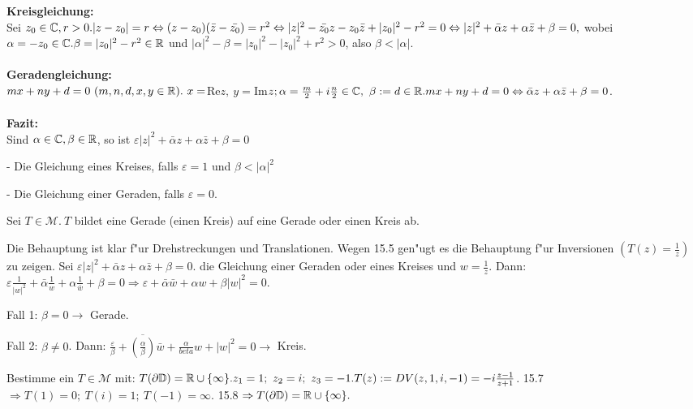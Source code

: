 \documentclass{article}
\begin{document}
{\bf Kreisgleichung:}\\
Sei $z_0 \in \mathbb{C}, r>0. |z-z_0|=r \Leftrightarrow (z-z_0)(\bar{z}-\bar{z_0}) = r^2 \Leftrightarrow |z|^2 - \bar{z_0}z-z_0\bar{z}+|z_0|^2-r^2=0 \Leftrightarrow |z|^2 + \bar{\alpha}z + \alpha\bar{z}+\beta=0,$ wobei $\alpha = -z_0 \in \mathbb{C}. \beta = |z_0|^2-r^2 \in \mathbb{R}$ und $|\alpha|^2-\beta = |z_0|^2-|z_0|^2+r^2 > 0$, also $ \beta < |\alpha|$.\\
\\
{\bf Geradengleichung:}\\
$mx+ny+d=0 \ (m,n,d,x,y \in \mathbb{R}). \ x = $Re$ z, \ y= $Im$ z; \alpha = \frac{m}{2}+i\frac{n}{2} \in \MdC, \ \beta := d \in \MdR. mx+ny+d = 0 \Leftrightarrow \bar{\alpha}z+\alpha\bar{z}+\beta=0$.\\
\\
{\bf Fazit:}\\
Sind $\alpha \in \mathbb{C}, \beta \in \mathbb{R}$, so ist $\varepsilon |z|^2 + \bar{\alpha}z + \alpha\bar{z}+\beta = 0$
\begin{liste}
\item[-] Die Gleichung eines Kreises, falls $\varepsilon = 1$ und $\beta < |\alpha|^2$
\item[-] Die Gleichung einer Geraden, falls $\varepsilon = 0.$
\end{liste}

\begin{satz}
Sei $T \in \mathcal{M}.\ T$ bildet eine Gerade (einen Kreis) auf eine Gerade oder einen Kreis ab.
\end{satz}

\begin{beweis}
Die Behauptung ist klar f"ur Drehstreckungen und Translationen. Wegen 15.5 gen"ugt es die Behauptung f"ur Inversionen $(T(z) = \frac1z)$ zu zeigen. Sei $\varepsilon|z|^2 + \bar{\alpha}z + \alpha\bar{z}+\beta =0$. die Gleichung einer Geraden oder eines Kreises und $w = \frac1z$. Dann: $\varepsilon \frac1{|w|^2}+ \bar{\alpha}\frac1w + \alpha \frac1{\bar{w}}+ \beta = 0 \Rightarrow \varepsilon + \bar{\alpha}\bar{w}+\alpha w + \beta |w|^2 = 0.$
\begin{liste}
\item[Fall 1:] $\beta = 0 \rightarrow$ Gerade.
\item[Fall 2:] $\beta \not=0$. Dann: $\frac{\varepsilon}{\beta} + \overline{\left(\frac{\alpha}{\beta}\right)} \bar{w} + \frac{\alpha}{beta}w + |w|^2 = 0 \rightarrow$ Kreis.
\end{liste}
\end{beweis}

\begin{beispiel}
Bestimme ein $T \in \mathcal{M}$ mit: $T(\partial \mathbb{D}) = \mathbb{R} \cup \{ \infty \}. z_1 = 1; \ z_2=i; \ z_3 = -1. T(z) := DV(z,1,i,-1) = -i\frac{z-1}{z+1}$. 15.7 $\Rightarrow T(1) = 0; \ T(i) = 1; \ T(-1) = \infty.$ 15.8 $\Rightarrow T(\partial \mathbb{D}) = \mathbb{R} \cup \{ \infty \}.$
\end{beispiel}
\end{document}
